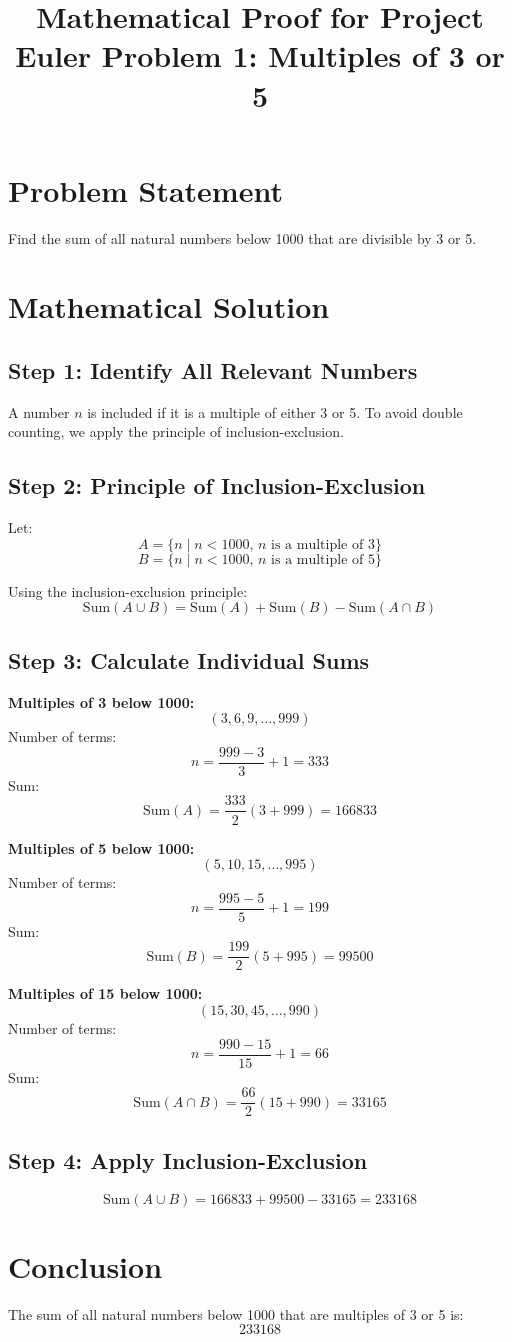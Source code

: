 \documentclass{article}
\title{Mathematical Proof for Project Euler Problem 1: Multiples of 3 or 5}
\author{}
\date{}
\begin{document}
\maketitle

\section*{Problem Statement}
Find the sum of all natural numbers below 1000 that are divisible by 3 or 5.

\section*{Mathematical Solution}

\subsection*{Step 1: Identify All Relevant Numbers}
A number \(n\) is included if it is a multiple of either 3 or 5.  
To avoid double counting, we apply the principle of inclusion-exclusion.

\subsection*{Step 2: Principle of Inclusion-Exclusion}
Let:
\[
A = \{n \mid n < 1000, \, n \text{ is a multiple of } 3\}
\]
\[
B = \{n \mid n < 1000, \, n \text{ is a multiple of } 5\}
\]

Using the inclusion-exclusion principle:
\[
\text{Sum}(A \cup B) = \text{Sum}(A) + \text{Sum}(B) - \text{Sum}(A \cap B)
\]

\subsection*{Step 3: Calculate Individual Sums}

\textbf{Multiples of 3 below 1000:}
\[
(3, 6, 9, \ldots, 999)
\]
Number of terms:
\[
n = \frac{999 - 3}{3} + 1 = 333
\]
Sum:
\[
\text{Sum}(A) = \frac{333}{2} (3 + 999) = 166833
\]

\textbf{Multiples of 5 below 1000:}
\[
(5, 10, 15, \ldots, 995)
\]
Number of terms:
\[
n = \frac{995 - 5}{5} + 1 = 199
\]
Sum:
\[
\text{Sum}(B) = \frac{199}{2} (5 + 995) = 99500
\]

\textbf{Multiples of 15 below 1000:}
\[
(15, 30, 45, \ldots, 990)
\]
Number of terms:
\[
n = \frac{990 - 15}{15} + 1 = 66
\]
Sum:
\[
\text{Sum}(A \cap B) = \frac{66}{2} (15 + 990) = 33165
\]

\subsection*{Step 4: Apply Inclusion-Exclusion}
\[
\text{Sum}(A \cup B) = 166833 + 99500 - 33165 = 233168
\]

\section*{Conclusion}
The sum of all natural numbers below 1000 that are multiples of 3 or 5 is:
\[
\boxed{233168}
\]
\end{document}
